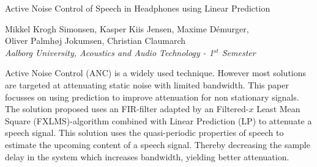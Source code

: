 
\begin{center}
\begin{huge}
Active Noise Control of Speech in Headphones using Linear Prediction  
\end{huge}

\vspace{5mm}
Mikkel Krogh Simonsen, Kasper Kiis Jensen, Maxime Démurger, \\ Oliver Palmhøj Jokumsen, Christian Claumarch
\\
\textit{Aalborg University, Acoustics and Audio Technology - 1$^{st}$ Semester}


\vspace{5mm}

Active Noise Control (ANC) is a widely used technique. However most solutions are targeted at attenuating static noise with limited bandwidth. This paper focusses on using prediction to improve attenuation for non stationary signals.
The solution proposed uses an FIR-filter adapted by an Filtered-$x$ Least Mean Square (FXLMS)-algorithm combined with Linear Prediction (LP) to attenuate a speech signal. This solution uses the quasi-periodic properties of speech to estimate the upcoming content of a speech signal. Thereby decreasing the sample delay in the system which increases bandwidth, yielding better attenuation.















\end{center}